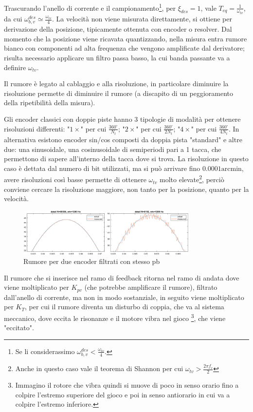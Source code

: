 Trascurando l'anello di corrente e il campionamento\footnote{Se li considerassimo \(\omega_{b,v}^{des} < \frac{\omega_{tv}}{4}\).}, per \(\xi_{des}=1\), vale \(T_{eq}=\frac{1}{\omega_{tv}}\), da cui \(\omega_{b,v}^{des}\simeq \frac{\omega_{tv}}{4}\).
La velocità non viene misurata direttamente, si ottiene per derivazione della posizione, tipicamente ottenuta con encoder o resolver. Dal momento che la posizione viene ricavata quantizzando, nella misura entra rumore bianco con componenti ad alta frequenza che vengono amplificate dal derivatore; risulta necessario applicare un filtro passa basso, la cui banda passante va a definire \(\omega_{tv}\).

Il rumore è legato al cablaggio e alla risoluzione, in particolare diminuire la risoluzione permette di diminuire il rumore (a discapito di un peggioramento della ripetibilità della misura). 

Gli encoder classici con doppie piste hanno 3 tipologie di modalità per ottenere risoluzioni differenti: "\(1\times\)" per cui \(\frac{360^\circ}{N_t}\); "\(2\times\)" per cui \(\frac{360^\circ}{2N_t}\); "\(4\times\)" per cui \(\frac{360^\circ}{4N_t}\).
In alternativa esistono encoder sin/cos composti da doppia pista "standard" e altre due: una sinusoidale, una cosinusoidale di semiperiodi pari a 1 tacca, che permettono di sapere all'interno della tacca dove si trova. La risoluzione in questo caso è dettata dal numero di bit utilizzati, ma si può arrivare fino \(0.0001 \text{arcmin}\), avere risoluzioni così basse permette di ottenere \(\omega_{tv}\) molto elevate\footnote{Anche in questo caso vale il teorema di Shannon {\color{red}{Inserire riferimento}} per cui \(\omega_{tv}>\frac{2\pi f_c}{2}\)}, perciò conviene cercare la risoluzione maggiore, non tanto per la posizione, quanto per la velocità.

\begin{figure}[h]
    \centering
    \includegraphics[width=0.8\textwidth]{Immagini/encoder1vs1_stesso_filtro.png}
    \caption{Rumore per due encoder filtrati con stesso pb}
\end{figure}

Il rumore che si inserisce nel ramo di feedback ritorna nel ramo di andata dove viene moltiplicato per \(K_{pv}\) (che potrebbe amplificare il rumore), filtrato dall'anello di corrente, ma non in modo sostanziale, in seguito viene moltiplicato per \(K_T\), per cui il rumore diventa un disturbo di coppia, che va al sistema meccanico, dove eccita le risonanze e il motore vibra nel gioco \footnote{Immagino il rotore che vibra quindi si muove di poco in senso orario fino a colpire l'estremo superiore del gioco e poi in senso antiorario in cui va a colpire l'estremo inferiore.}, che viene "eccitato".

